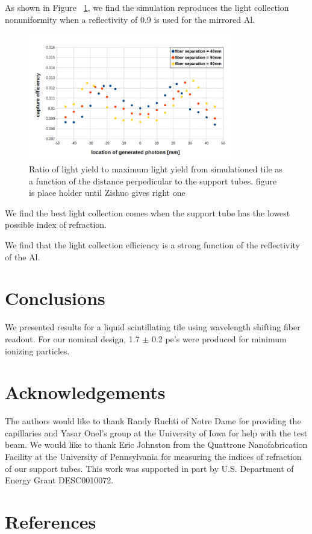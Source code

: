 \documentclass[review]{elsarticle}
\begin{document}
As shown in Figure ~\ref{fig:simeff}, we find the simulation reproduces the light collection nonuniformity when a reflectivity of 0.9 is used for the mirrored Al.

\begin{figure}[!ht]
\begin{center}
\includegraphics[width=0.8\textwidth]{./figures/geant_result_uniformity.png}
\caption{
Ratio of light yield to maximum light yield from simulationed tile as a function of the distance perpedicular to the support tubes. {\color{red} figure is place holder until Zishuo gives right one}
}
\label{fig:simeff}
\end{center}
\end{figure}

We find the best light collection comes when the support tube has the
lowest possible index of refraction.

We find that the light collection efficiency is a strong function of the reflectivity of the Al.

\section{Conclusions}

We presented results for a liquid scintillating tile using wavelength shifting fiber readout.  For our nominal design, 1.7 ${\pm}$ 0.2 pe's were produced for minimum ionizing particles.  

\section{Acknowledgements}
The authors would like to thank Randy Ruchti of Notre Dame for providing the capillaries and Yasar Onel's group at the University of Iowa for help with the test beam.  We would like to thank Eric Johnston from the Quattrone Nanofabrication Facility  at the University of Pennsylvania for measuring the indices of refraction of our support tubes.
This work was supported in part by U.S. Department of Energy Grant DESC0010072.

\section*{References}


\end{document}
